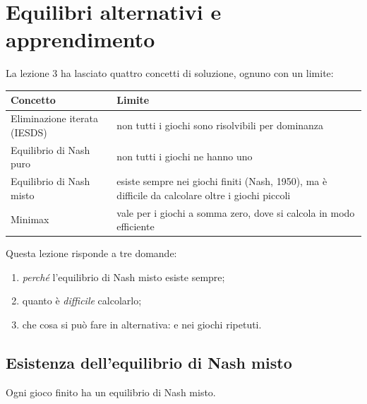 \chapter{Equilibri alternativi e apprendimento}

\parteteoria

La lezione 3 ha lasciato quattro concetti di soluzione, ognuno con un limite:
\begin{center}
\renewcommand{\arraystretch}{1.25}
\begin{tabularx}{\linewidth}{@{}l X@{}}
\toprule
Concetto & Limite \\
\midrule
Eliminazione iterata (IESDS) & non tutti i giochi sono risolvibili per dominanza \\
Equilibrio di Nash puro & non tutti i giochi ne hanno uno \\
Equilibrio di Nash misto & esiste sempre nei giochi finiti (Nash, 1950), ma è difficile da
calcolare oltre i giochi piccoli \\
Minimax & vale per i giochi a somma zero, dove si calcola in modo efficiente \\
\bottomrule
\end{tabularx}
\end{center}

Questa lezione risponde a tre domande:
\begin{enumerate}[label=\arabic*.]
  \item \emph{perché} l'equilibrio di Nash misto esiste sempre;
  \item quanto è \emph{difficile} calcolarlo;
  \item che cosa si può fare in alternativa:  e 
        nei giochi ripetuti.
\end{enumerate}

\section{Esistenza dell'equilibrio di Nash misto}

\begin{teorema}[Nash, 1950]
Ogni gioco finito ha un equilibrio di Nash misto.
\end{teorema}

